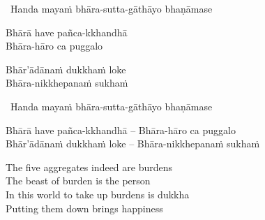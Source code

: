 \ifninebythirteen

\begin{leader}
  \anglebracketleft\ \hspace{-0.5mm}Handa mayaṁ bhāra-sutta-gāthāyo bhaṇāmase \hspace{-0.5mm}\anglebracketright\
\end{leader}

\begin{pali-hang-verses}
  Bhārā have pañca-kkhandhā\\
  Bhāra-hāro ca puggalo
\end{pali-hang-verses}
\begin{pali-hang-together}
  Bhār'ādānaṁ dukkhaṁ loke\\
  Bhāra-nikkhepanaṁ sukhaṁ
\end{pali-hang-together}

\else

\begin{leader}
  \anglebracketleft\ \hspace{-0.5mm}Handa mayaṁ bhāra-sutta-gāthāyo bhaṇāmase \hspace{-0.5mm}\anglebracketright\
\end{leader}

\begin{verses}
  Bhārā have pañca-kkhandhā – Bhāra-hāro ca puggalo\\
  Bhār'ādānaṁ dukkhaṁ loke – Bhāra-nikkhepanaṁ sukhaṁ
\end{verses}

\fi

\begin{english-verses}
  The five aggregates indeed are burdens\\
  The beast of burden is the person\ifdigital\makeatletter\hyperlink{endnote39-appendix}\makeatother\fi\\
  In this world to take up burdens is dukkha\\
  Putting them down brings happiness
\end{english-verses}

